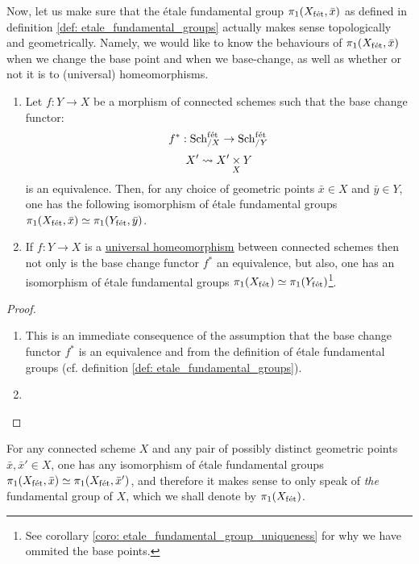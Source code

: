         Now, let us make sure that the \'etale fundamental group $\pi_1(X_{\mathrm{f\acute{e}t}}, \bar{x})$ as defined in definition \ref{def: etale_fundamental_groups} actually makes sense topologically and geometrically. Namely, we would like to know the behaviours of $\pi_1(X_{\mathrm{f\acute{e}t}}, \bar{x})$ when we change the base point and when we base-change, as well as whether or not it is  to (universal) homeomorphisms.
        \begin{proposition} \label{prop: the_etale_fundamental_group_as_a_topological_invariance}
            \noindent
            \begin{enumerate}
                \item Let $f: Y \to X$ be a morphism of connected schemes such that the base change functor:
                    $$f^*: \mathrm{Sch}_{/X}^{\mathrm{f\acute{e}t}} \to \mathrm{Sch}_{/Y}^{\mathrm{f\acute{e}t}}$$
                    $$X' \mapsto X' \x_X Y$$
                is an equivalence. Then, for any choice of geometric points $\bar{x} \in X$ and $\bar{y} \in Y$, one has the following isomorphism of \'etale fundamental groups $\pi_1(X_{\mathrm{f\acute{e}t}}, \bar{x}) \simeq \pi_1(Y_{\mathrm{f\acute{e}t}}, \bar{y})$.
                \item If $f: Y \to X$ is a \href{https://stacks.math.columbia.edu/tag/04DC}{\underline{universal homeomorphism}} between connected schemes then not only is the base change functor $f^*$ an equivalence, but also, one has an isomorphism of \'etale fundamental groups $\pi_1(X_{\mathrm{f\acute{e}t}}) \simeq \pi_1(Y_{\mathrm{f\acute{e}t}})$\footnote{See corollary \ref{coro: etale_fundamental_group_uniqueness} for why we have ommited the base points.}. 
            \end{enumerate}
        \end{proposition}
            \begin{proof}
                \noindent
                \begin{enumerate}
                    \item This is an immediate consequence of the assumption that the base change functor $f^*$ is an equivalence and from the definition of \'etale fundamental groups (cf. definition \ref{def: etale_fundamental_groups}).
                    \item 
                \end{enumerate}
            \end{proof}
        \begin{corollary} \label{coro: etale_fundamental_group_uniqueness}
            For any connected scheme $X$ and any pair of possibly distinct geometric points $\bar{x}, \bar{x}' \in X$, one has any isomorphism of \'etale fundamental groups $\pi_1(X_{\mathrm{f\acute{e}t}}, \bar{x}) \simeq \pi_1(X_{\mathrm{f\acute{e}t}}, \bar{x}')$, and therefore it makes sense to only speak of \textit{the} fundamental group of $X$, which we shall denote by $\pi_1(X_{\mathrm{f\acute{e}t}})$.
        \end{corollary}
        
